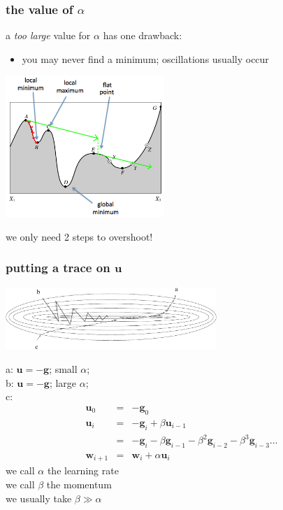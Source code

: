 \documentclass[USenglish,pdftex,compress,10pt,svgnamesi,handout]{beamer}
\def\Vec#1{\textbf{#1}}
\begin{document}
\begin{frame}
\frametitle{the value of $\alpha$}

a \textsl{too large} value for $\alpha$ has one drawback:
\begin{itemize}
\item you may never find a minimum; oscillations usually occur
\end{itemize}

\centerline{\includegraphics[width=6cm]{pics/optimise7.png}}

we only need 2 steps to overshoot!
\end{frame}




\begin{frame}
\frametitle{putting a trace on $\Vec u$}

\centerline{\includegraphics[width=8cm]{pics/momentum.pdf}}
a: $\Vec u = -\Vec g$; small $\alpha$;\\
b: $\Vec u = -\Vec g$; large $\alpha$;\\
c: \begin{eqnarray}
\Vec u_{0} &=& -\Vec g_{0}\\
\Vec u_{i} &=& -\Vec g_{i} + \beta\Vec u_{i-1}\\
		&=& -\Vec g_{i} - \beta\Vec g_{i-1}  - \beta^2\Vec g_{i-2}  - \beta^3\Vec g_{i-3} \dots\\
\Vec w_{i+1} &=& \Vec w_{i} + \alpha \Vec u_{i} 
\end{eqnarray}
we call $\alpha$ the \alert{learning rate}\\
we call $\beta$ the \alert{momentum}\\
we usually take $\beta \gg \alpha$


\end{frame}
\end{document}
